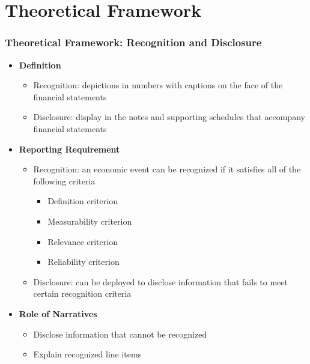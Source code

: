 \documentclass{beamer}
\begin{document}
\section{Theoretical Framework}
\begin{frame}
\frametitle{Theoretical Framework: Recognition and Disclosure}
\begin{itemize}
\item \textbf{Definition \citep{schipperRequiredDisclosuresFinancial2007}}
	
	\begin{itemize}
		\item Recognition: depictions in numbers with captions on the face of the financial statements
		\item Disclosure: display in the notes and supporting schedules that accompany financial statements
	\end{itemize}

\item \textbf{Reporting Requirement \citep{fasbStatementFinancialAccounting1984}}

	\begin{itemize}
		\item Recognition: an economic event can be recognized if it satisfies all of the following criteria
		\begin{itemize}
			\item Definition criterion
			\item Measurability criterion
			\item Relevance criterion
			\item Reliability criterion
		\end{itemize}
		\item Disclosure: can be deployed to disclose information that fails to meet certain recognition criteria
	\end{itemize}

\item \textbf{Role of Narratives} 

	\begin{itemize}
		\item Disclose information that cannot be recognized
		\item Explain recognized line items
	\end{itemize}

\end{itemize}
\end{frame}
\end{document}
